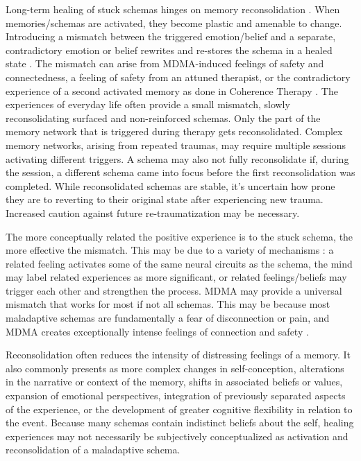 \documentclass[12pt,letterpaper]{article}
\begin{document}
Long-term healing of stuck schemas hinges on memory reconsolidation \cite{fedduciaMDMAMemoryReconsolidation}. When memories/schemas are activated, they become plastic and amenable to change. Introducing a mismatch between the triggered emotion/belief and a separate, contradictory emotion or belief rewrites and re-stores the schema in a healed state \cite{laneReconsolidation}. The mismatch can arise from MDMA-induced feelings of safety and connectedness, a feeling of safety from an attuned therapist, or the contradictory experience of a second activated memory as done in Coherence Therapy \cite{eckerUnlocking}. The experiences of everyday life often provide a small mismatch, slowly reconsolidating surfaced and non-reinforced schemas. Only the part of the memory network that is triggered during therapy gets reconsolidated. Complex memory networks, arising from repeated traumas, may require multiple sessions activating different triggers. A schema may also not fully reconsolidate if, during the session, a different schema came into focus before the first reconsolidation was completed. While reconsolidated schemas are stable, it's uncertain how prone they are to reverting to their original state after experiencing new trauma. Increased caution against future re-traumatization may be necessary. 

The more conceptually related the positive experience is to the stuck schema, the more effective the mismatch. This may be due to a variety of mechanisms : a related feeling activates some of the same neural circuits as the schema, the mind may label related experiences as more significant, or related feelings/beliefs may trigger each other and strengthen the process. MDMA may provide a universal mismatch that works for most if not all schemas. This may be because most maladaptive schemas are fundamentally a fear of disconnection or pain, and MDMA creates exceptionally intense feelings of connection and safety \cite{brownDaring}.

Reconsolidation often reduces the intensity of distressing feelings of a memory. It also commonly presents as more complex changes in self-conception, alterations in the narrative or context of the memory, shifts in associated beliefs or values, expansion of emotional perspectives, integration of previously separated aspects of the experience, or the development of greater cognitive flexibility in relation to the event. Because many schemas contain indistinct beliefs about the self, healing experiences may not necessarily be subjectively conceptualized as activation and reconsolidation of a maladaptive schema.
\end{document}
